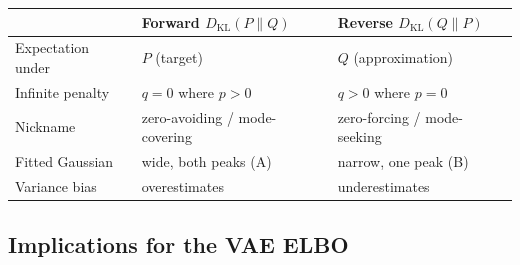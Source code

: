 \documentclass[11pt]{article}
\newcommand{\KL}{D_{\mathrm{KL}}}
\begin{document}
\begin{center}
\begin{tabular}{@{}lll@{}}
  \toprule
  & Forward \(\KL(P\|Q)\) & Reverse \(\KL(Q\|P)\) \\
  \midrule
  Expectation under & \(P\) (target) & \(Q\) (approximation) \\
  Infinite penalty & \(q=0\) where \(p>0\) & \(q>0\) where \(p=0\) \\
  Nickname & zero-avoiding / mode-covering & zero-forcing / mode-seeking \\
  Fitted Gaussian & wide, both peaks (A) & narrow, one peak (B) \\
  Variance bias & overestimates & underestimates \\
  \bottomrule
\end{tabular}
\end{center}

\subsection{Implications for the VAE ELBO}
\end{document}
